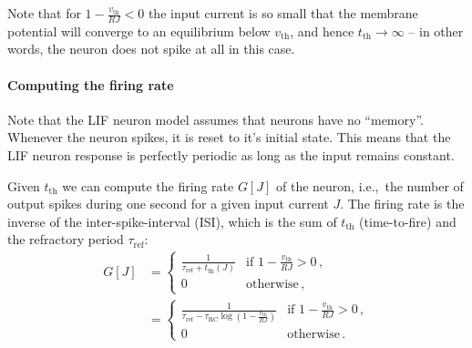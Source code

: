 \documentclass[10pt,letterpaper,oneside]{article}
\begin{document}

Note that for $1 - \frac{v_\mathrm{th}}{RJ} < 0$ the input current is so small that the membrane potential will converge to an equilibrium below $v_\mathrm{th}$, and hence $t_\mathrm{th} \to \infty$ -- in other words, the neuron does not spike at all in this case.

\paragraph{Computing the firing rate}

Note that the LIF neuron model assumes that neurons have no \enquote{memory}. Whenever the neuron spikes, it is reset to it's initial state. This means that the LIF neuron response is perfectly periodic as long as the input remains constant.


Given $t_\mathrm{th}$ we can compute the firing rate $G[J]$ of the neuron, i.e.,~the number of output spikes during one second for a given input current $J$. The firing rate is the inverse of the inter-spike-interval (ISI), which is the sum of $t_\mathrm{th}$ (time-to-fire) and the refractory period $\tau_\mathrm{ref}$:
\begin{align*}
	G[J]
		&= \begin{cases}
			\frac{1}{\tau_\mathrm{ref} + t_\mathrm{th}(J)} & \text{if } 1 - \frac{v_\mathrm{th}}{RJ} > 0 \,,\\
			0 & \mathrm{otherwise} \,,
		\end{cases} \\
		&= \begin{cases}
			\frac{1}{\tau_\mathrm{ref} - \tau_\mathrm{RC} \log \left( 1 - \frac{v_\mathrm{th}}{RJ} \right)} & \text{if } 1 - \frac{v_\mathrm{th}}{RJ} > 0 \,,\\
			0 & \mathrm{otherwise} \,.
		\end{cases}
\end{align*}
\end{document}
